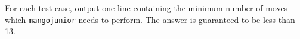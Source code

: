 For each test case, output one line containing the minimum number of moves which
\texttt{mangojunior} needs to perform. The answer is guaranteed to be less than 13.
